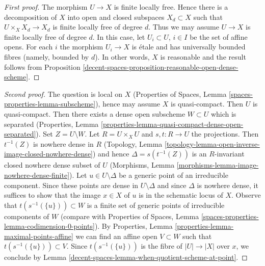\begin{proof}[First proof]
The morphism $U \to X$ is finite locally free. Hence there is a decomposition
of $X$ into open and closed subspaces $X_d \subset X$ such that
$U \times_X X_d \to X_d$ is finite locally free of degree $d$.
Thus we may assume $U \to X$ is finite locally free of degree $d$.
In this case, let $U_i \subset U$, $i \in I$ be the set of affine opens.
For each $i$ the morphism $U_i \to X$ is \'etale and has
universally bounded fibres (namely, bounded by $d$).
In other words, $X$ is reasonable and
the result follows from
Proposition \ref{decent-spaces-proposition-reasonable-open-dense-scheme}.
\end{proof}

\begin{proof}[Second proof]
The question is local on $X$
(Properties of Spaces, Lemma \ref{spaces-properties-lemma-subscheme}),
hence may assume $X$ is quasi-compact. Then $U$ is quasi-compact.
Then there exists a dense open subscheme $W \subset U$ which is
separated (Properties, Lemma
\ref{properties-lemma-quasi-compact-dense-open-separated}).
Set $Z = U \setminus W$.
Let $R = U \times_X U$ and $s, t : R \to U$ the projections.
Then $t^{-1}(Z)$ is nowhere dense in $R$
(Topology, Lemma \ref{topology-lemma-open-inverse-image-closed-nowhere-dense})
and hence $\Delta = s(t^{-1}(Z))$ is an $R$-invariant
closed nowhere dense subset of $U$
(Morphisms, Lemma \ref{morphisms-lemma-image-nowhere-dense-finite}).
Let $u \in U \setminus \Delta$ be a generic point of an
irreducible component. Since these points are dense in $U \setminus \Delta$
and since $\Delta$ is nowhere dense, it suffices to show that the image
$x \in X$ of $u$ is in the schematic locus of $X$.
Observe that $t(s^{-1}(\{u\})) \subset W$ is a
finite set of generic points of irreducible components of $W$
(compare with
Properties of Spaces, Lemma
\ref{spaces-properties-lemma-codimension-0-points}).
By Properties, Lemma \ref{properties-lemma-maximal-points-affine}
we can find an affine open $V \subset W$ such that
$t(s^{-1}(\{u\})) \subset V$. Since $t(s^{-1}(\{u\}))$ is the fibre
of $|U| \to |X|$ over $x$, we conclude by
Lemma \ref{decent-spaces-lemma-when-quotient-scheme-at-point}.
\end{proof}

